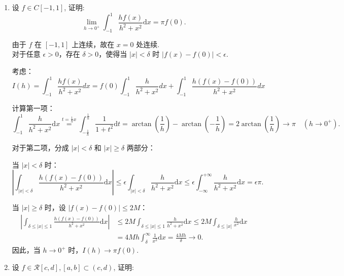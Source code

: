 \begin{enumerate}
    \item[6.]设 \(\displaystyle f \in C[-1,1]\), 证明:
    \[\displaystyle\lim_{h\to 0^{+}}\int_{-1}^{1}{\frac{h f(x)}{h^{2} + x^{2}}}\mathrm{d}x = \pi f(0).\]
    \begin{solution}
        由于 $f$ 在 $[-1,1]$ 上连续，故在 $x=0$ 处连续.\\
        对于任意 $\epsilon > 0$，存在 $\delta > 0$，使得当 $|x| < \delta$ 时 $|f(x) - f(0)| < \epsilon$.

        考虑：
        \[
        I(h) = \int_{-1}^1 \frac{h f(x)}{h^2 + x^2} dx = f(0) \int_{-1}^1 \frac{h}{h^2 + x^2} dx + \int_{-1}^1 \frac{h (f(x) - f(0))}{h^2 + x^2} dx
        \]

        计算第一项：
        \[
        \int_{-1}^1 \frac{h}{h^2 + x^2} \mathrm{d}x \overset{t=\frac{1}{h}x}{=} \int_{-\frac{1}{h}}^{\frac{1}{h}} \frac{1}{1 + t^2} \mathrm{d}t = \arctan\left(\frac{1}{h}\right) - \arctan\left(-\frac{1}{h}\right) = 2 \arctan\left(\frac{1}{h}\right) \to \pi \quad (h \to 0^+).
        \]

        对于第二项，分成 $|x| < \delta$ 和 $|x| \geq \delta$ 两部分：

        当 $|x| < \delta$ 时：
        \[
        \left| \int_{|x| < \delta} \frac{h (f(x) - f(0))}{h^2 + x^2} \mathrm{d}x \right| \leq \epsilon \int_{|x| < \delta} \frac{h}{h^2 + x^2} \mathrm{d}x \leq \epsilon \int_{-\infty}^{+\infty} \frac{h}{h^2 + x^2} \mathrm{d}x = \epsilon \pi.
        \]

        当 $|x| \geq \delta$ 时，设 $|f(x) - f(0)| \leq 2M$：
        \[
        \begin{aligned}
        \left| \int_{\delta \leq |x| \leq 1} \frac{h (f(x) - f(0))}{h^2 + x^2} \mathrm{d}x \right| &\leq 2M \int_{\delta \leq |x| \leq 1} \frac{h}{h^2 + x^2} \mathrm{d}x \leq 2M \int_{\delta \leq |x|} \frac{h}{x^2} \mathrm{d}x\\
        &= 4M h \int_{\delta}^\infty \frac{1}{x^2} \mathrm{d}x = \frac{4M h}{\delta} \to 0.	
        \end{aligned}
        \]
        因此，当 $h \to 0^+$ 时，$I(h) \to \pi f(0)$.
    \end{solution}
    
    \item[7.]设 \(\displaystyle f \in \mathcal{R}[c,d], [a,b] \subset (c,d)\), 证明:


\end{enumerate}
